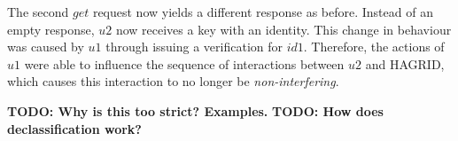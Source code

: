The second \(get\) request now yields a different response as before. Instead of an empty response, \(u2\) now receives a key with an identity. This change in behaviour was caused by \(u1\) through issuing a verification for \(id1\). Therefore, the actions of \(u1\) were able to influence the sequence of interactions between \(u2\) and HAGRID, which causes this interaction to no longer be \emph{non-interfering}.

\textbf{TODO: Why is this too strict? Examples.}
\textbf{TODO: How does declassification work?}

\newpage
